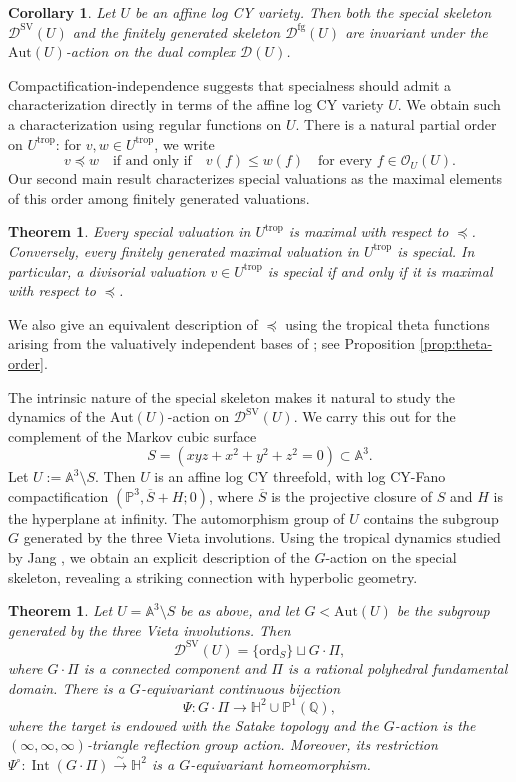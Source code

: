 \documentclass[reqno, 12pt]{amsart}
\newtheorem{thm}[prop]{Theorem}
\newtheorem{cor}[prop]{Corollary}
\theoremstyle{definition}
\newcommand{\bP}{\mathbb{P}}
\newcommand{\bA}{\mathbb{A}}
\newcommand{\bQ}{\mathbb{Q}}
\newcommand{\cO}{\mathcal{O}}
\newcommand{\cD}{\mathcal{D}}
\newcommand{\Aut}{\mathrm{Aut}}
\newcommand{\ord}{\mathrm{ord}}
\newcommand{\trop}{\mathrm{trop}}
\newcommand{\SV}{\mathrm{SV}}
\newcommand{\bH}{\mathbb{H}}
\newcommand{\rfg}{\mathrm{fg}}
\numberwithin{equation}{section}
\begin{document}
\begin{cor}\label{cor:aut}
Let $U$ be an affine log CY variety. Then both the special skeleton $\cD^{\SV}(U)$ and the finitely generated skeleton $\cD^{\rfg}(U)$  are invariant under the $\Aut(U)$-action on the dual complex $\cD(U)$. 
\end{cor}

Compactification-independence suggests that specialness should
admit a characterization directly in terms of the affine log CY
variety $U$. We obtain such a characterization using regular
functions on $U$. There is a natural partial order on
$U^{\trop}$: for
$v,w\in U^{\trop}$, we write
\[
v\preceq w
\quad\textrm{if and only if}\quad
v(f)\leq w(f)
\quad\text{for every }f\in \cO_U(U).
\]
Our second main result  characterizes special valuations as the
maximal elements of this order among finitely generated
valuations.

\begin{thm}\label{thm:maximality-intro}
Every special valuation in $U^{\trop}$ is maximal with respect to $\preceq$. Conversely, every finitely generated maximal valuation in $U^{\trop}$ is special.
In particular, a divisorial valuation $v\in U^{\trop}$ is special if and only if it is maximal with respect to $\preceq$.
\end{thm}

We also give an equivalent description of $\preceq$ using the
tropical theta functions arising from the valuatively
independent bases of \cite{BL26}; see Proposition \ref{prop:theta-order}.

The intrinsic nature of the special skeleton makes it natural to study the dynamics of the $\Aut(U)$-action on $\cD^{\SV}(U)$. We carry this out for the complement of the Markov cubic surface
\[
S=(xyz+x^2+y^2+z^2=0)\subset \bA^3.
\]
Let $U:=\bA^3\setminus S$. Then $U$ is an affine log CY threefold, with
 log CY-Fano compactification
$(\bP^3,\overline S+H;0)$,
where $\overline S$ is the projective closure of $S$ and $H$ is the hyperplane at infinity. 
The automorphism group of $U$ contains the subgroup $G$ generated by the three Vieta involutions. Using the tropical dynamics studied by Jang \cite{Jan23}, we obtain an explicit description of the $G$-action on the special skeleton, revealing a striking connection with hyperbolic geometry.


\begin{thm}\label{thm:intro-markov}
Let $U=\bA^3\setminus S$ be as above, and let
$G<\Aut(U)$ be the subgroup generated by the three Vieta involutions.
Then 
\[
\cD^{\SV}(U)=\{\ord_S\}\sqcup G\cdot \Pi,
\]
where $G\cdot\Pi$ is a connected component and $\Pi$ is a rational polyhedral fundamental domain. There is a
$G$-equivariant continuous bijection
\[
\Psi: G\cdot \Pi\to
\bH^2\cup\bP^1(\bQ),
\]
where the target is endowed with the Satake topology and the $G$-action
is the $(\infty,\infty,\infty)$-triangle reflection group action.
Moreover, its restriction $\Psi^\circ:
\operatorname{Int}(G\cdot \Pi)
\xrightarrow{\sim}\bH^2$
is a $G$-equivariant homeomorphism.
\end{thm}
\end{document}
